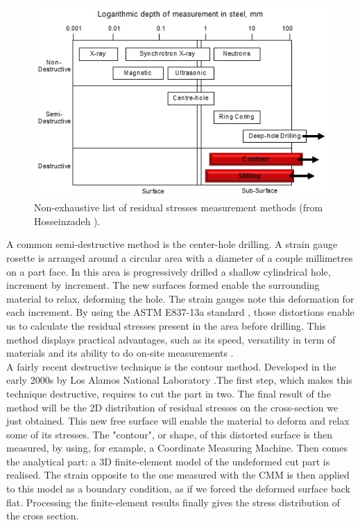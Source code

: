 \begin{figure}[ht]
	\centering
	\includegraphics[scale=0.80]{Images/rs_measure}
	\decoRule
	\caption[Non-exhaustive list of residual stresses measurement methods.]{Non-exhaustive list of residual stresses measurement methods (from Hosseinzadeh \parencite{Openuni}).}
	\label{fig:rs_measure}
\end{figure}

A common semi-destructive method is the center-hole drilling. A strain gauge rosette is arranged around a circular area with a diameter of a couple millimetres on a part face. In this area is progressively drilled a shallow cylindrical hole, increment by increment. The new surfaces formed enable the surrounding material to relax, deforming the hole. The strain gauges note this deformation for each increment. By using the ASTM E837-13a standard \cite{ASTM}, those distortions enable us to calculate the residual stresses present in the area before drilling. This method displays practical advantages, such as its speed, versatility in term of materials and its ability to do on-site measurements \cite{G2MT}. \\

A fairly recent destructive technique is the contour method. Developed in the early 2000s by Los Alamos National Laboratory \cite{LANL}.The first step, which makes this technique destructive, requires to cut the part in two. The final result of the method will be the 2D distribution of residual stresses on the cross-section we just obtained. This new free surface will enable the material to deform and relax some of its stresses. The "contour", or shape, of this distorted surface is then measured, by using, for example, a Coordinate Measuring Machine. Then comes the analytical part: a 3D finite-element model of the undeformed cut part is realised. The strain opposite to the one measured with the CMM is then applied to this model as a boundary condition, as if we forced the deformed surface back flat. Processing the finite-element results finally gives the stress distribution of the cross section.\\


